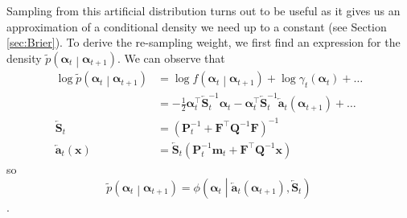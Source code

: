 \documentclass[notitlepage]{article}
\renewcommand{\vec}[1]{\bm{#1}}
\newcommand{\vecLarrow}[1]{\overleftarrow{\vec{#1}}}
\newcommand{\mat}[1]{\mathbf{#1}}
\newcommand{\matLarrow}[1]{\overleftarrow{\mat{#1}}}
\newcommand{\Lparen}[1]{\left( #1\right)}
\newcommand{\Cond}[2]{ #1 \middle\vert  #2}
\newcommand{\optor}[2]{#1\Lparen{#2}}
\newcommand{\optorC}[3]{\optor{#1}{\Cond{#2}{#3}}}
\newcommand{\pdenstC}[2]{\optorC{\widetilde p}{#1}{#2}}
\newcommand{\normaldC}[3]{\optorC{\phi}{#1}{#2,#3}}
\begin{document}
Sampling from this artificial distribution turns out to be useful as it gives us an approximation of a
conditional density we need up to a constant (see Section \ref{sec:Brier}).
To derive the re-sampling weight, we first find an expression for the density $\pdenstC{\vec{\alpha}_t}{\vec{\alpha}_{t + 1}}$. 
We can observe that %
%
\begin{align*}
\log\pdenstC{\vec{\alpha}_t}{\vec{\alpha}_{t + 1}} &=  
	\log \optorC{f}{\vec\alpha_t}{\vec\alpha_{t + 1}}
	+ \log \gamma_t(\vec\alpha_t) + \dots \\
	&= -\frac 12\vec\alpha_t^\top\matLarrow{S}_t^{-1}
	\vec\alpha_t - \vec\alpha_t^\top\matLarrow{S}_t^{-1}
	\vecLarrow{a}_t(\vec\alpha_{t+1})
	+ \dots \\
\matLarrow{S}_t  &= \Lparen{\mat P^{-1}_t + \mat F^\top\mat Q^{-1}\mat F}^{-1} \\
\vecLarrow{a}_t(\vec x) &= 
	\matLarrow{S}_t\Lparen{\mat P_t^{-1}\vec m_t + \mat F^\top \mat Q^{-1}\vec x}
\end{align*}
%
so %
%
\begin{equation}\label{eqn:bwTransProp}
\pdenstC{\vec{\alpha}_t}{\vec{\alpha}_{t + 1}} = %
\normaldC{\vec\alpha_t}{\vecLarrow{a}_t(\vec{\alpha}_{t + 1})}%
{\matLarrow{S}_t}
\end{equation}. 
\end{document}
